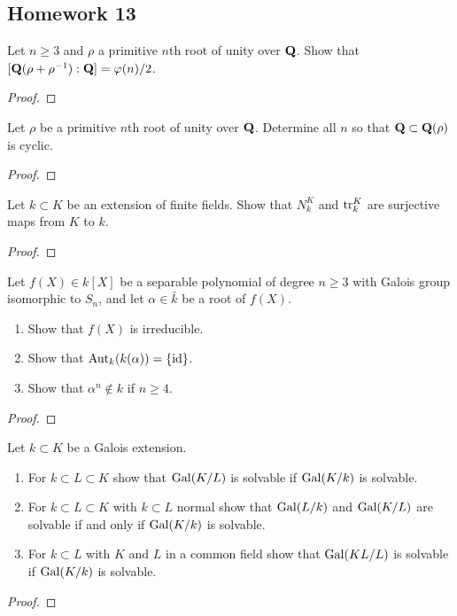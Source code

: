 \subsection{Homework 13}
\begin{problem}
Let $n\geq 3$ and $\rho$ a primitive $n$th root of unity over $\mathbf{Q}$. Show
that $[\mathbf{Q}(\rho+\rho^{-1}):\mathbf{Q}]=\varphi(n)/2$.
\end{problem}
\begin{proof}
\end{proof}

\begin{problem}
Let $\rho$ be a primitive $n$th root of unity over $\mathbf{Q}$. Determine all
$n$ so that $\mathbf{Q}\subset\mathbf{Q}(\rho)$ is cyclic.
\end{problem}
\begin{proof}
\end{proof}

\begin{problem}
Let $k\subset K$ be an extension of finite fields. Show that $N_k^K$ and
$\operatorname{tr}_k^K$ are surjective maps from $K$ to $k$.
\end{problem}
\begin{proof}
\end{proof}

\begin{problem}
Let $f(X)\in k[X]$ be a separable polynomial of degree $n\geq 3$ with
Galois group isomorphic to $S_n$, and let $\alpha\in\bar k$ be a root of
$f(X)$.
\begin{enumerate}[label=(\alph*),noitemsep]
\item Show that $f(X)$ is irreducible.
\item Show that $\operatorname{Aut}_k(k(\alpha))=\{\operatorname{id}\}$.
\item Show that $\alpha^n\notin k$ if $n\geq 4$.
\end{enumerate}
\end{problem}
\begin{proof}
\end{proof}

\begin{problem}
Let $k\subset K$ be a Galois extension.
\begin{enumerate}[label=(\alph*),noitemsep]
\item For $k\subset L\subset K$ show that $\operatorname{Gal}(K/L)$ is solvable if
  $\operatorname{Gal}(K/k)$ is solvable.
\item For $k\subset L\subset K$ with $k\subset L$ normal show that
  $\operatorname{Gal}(L/k)$ and $\operatorname{Gal}(K/L)$ are solvable if and only if $\operatorname{Gal}(K/k)$ is
  solvable.
\item For $k\subset L$ with $K$ and $L$ in a common field show that
  $\operatorname{Gal}(KL/L)$ is solvable if $\operatorname{Gal}(K/k)$ is solvable.
\end{enumerate}
\end{problem}
\begin{proof}
\end{proof}

